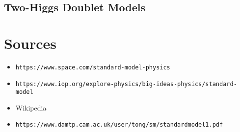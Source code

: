 \documentclass{article}
\begin{document}
\subsection{Two-Higgs Doublet Models}

 
\section{Sources}

    \begin{itemize}
        \item \texttt{https://www.space.com/standard-model-physics}
        \item \texttt{https://www.iop.org/explore-physics/big-ideas-physics/standard-model}
        \item Wikipedia
        \item \texttt{https://www.damtp.cam.ac.uk/user/tong/sm/standardmodel1.pdf}
    \end{itemize}
\end{document}
